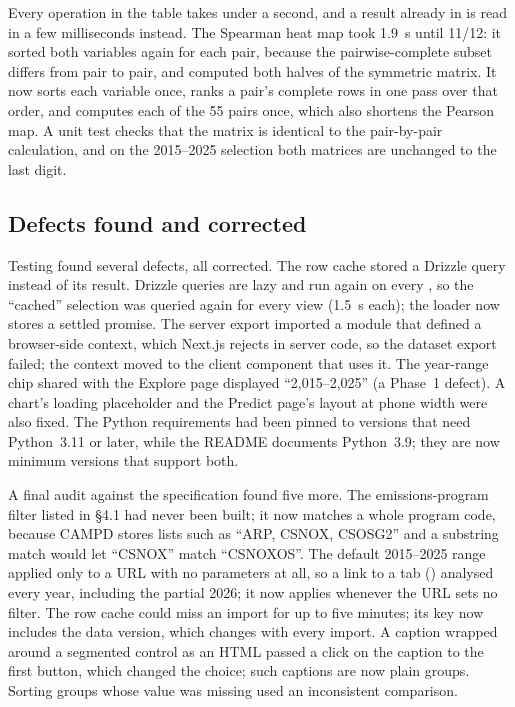 \documentclass[11pt,a4paper]{article}
\begin{document}
Every operation in the table takes under a second, and a result already in 
is read in a few milliseconds instead. The Spearman heat map took 1.9~s until 11/12: it sorted
both variables again for each pair, because the pairwise-complete subset differs from pair to
pair, and computed both halves of the symmetric matrix. It now sorts each variable once, ranks a
pair's complete rows in one pass over that order, and computes each of the 55 pairs once, which
also shortens the Pearson map. A unit test checks that the matrix is identical to the pair-by-pair
calculation, and on the 2015--2025 selection both matrices are unchanged to the last digit.

\subsection{Defects found and corrected}

Testing found several defects, all corrected. The row cache stored a Drizzle query
instead of its result. Drizzle queries are lazy and run again on every , so the
``cached'' selection was queried again for every view (1.5~s each); the loader now stores a
settled promise. The server export imported a module that defined a browser-side context, which
Next.js rejects in server code, so the dataset export failed; the context moved to the client
component that uses it. The year-range chip shared with the Explore page displayed
``2,015--2,025'' (a Phase~1 defect). A chart's loading placeholder and the Predict page's layout
at phone width were also fixed. The Python requirements had been pinned to versions that need
Python~3.11 or later, while the README documents Python~3.9; they are now minimum versions that
support both.

A final audit against the specification found five more. The emissions-program filter listed in
\S4.1 had never been built; it now matches a whole program code, because CAMPD stores lists such
as ``ARP, CSNOX, CSOSG2'' and a substring match would let ``CSNOX'' match ``CSNOXOS''. The
default 2015--2025 range applied only to a URL with no parameters at all, so a link to a tab
() analysed every year, including the partial 2026; it now applies
whenever the URL sets no filter. The row cache could miss an import for up to five minutes; its key
now includes the data version, which changes with every import. A caption wrapped around a segmented control as an
HTML  passed a click on the caption to the first button, which changed the choice;
such captions are now plain groups. Sorting groups whose value was missing used an inconsistent
comparison.
\end{document}
